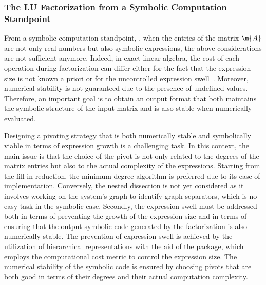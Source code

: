 \subsubsection{The LU Factorization from a Symbolic Computation Standpoint}

From a symbolic computation standpoint, \ie{}, when the entries of the matrix $\m{A}$ are not only real numbers but also symbolic expressions, the above considerations are not sufficient anymore. Indeed, in exact linear algebra, the cost of each operation during factorization can differ either for the fact that the expression size is not known a priori or for the uncontrolled expression swell~\cite{zhou2006hierarchical}. Moreover, numerical stability is not guaranteed due to the presence of undefined values. Therefore, an important goal is to obtain an output format that both maintains the symbolic structure of the input matrix and is also stable when numerically evaluated.

Designing a pivoting strategy that is both numerically stable and symbolically viable in terms of expression growth is a challenging task. In this context, the main issue is that the choice of the pivot is not only related to the degrees of the matrix entries but also to the actual complexity of the expressions. Starting from the fill-in reduction, the minimum degree algorithm is preferred due to its ease of implementation. Conversely, the nested dissection is not yet considered as it involves working on the system's graph to identify graph separators, which is no easy task in the symbolic case. Secondly, the expression swell must be addressed both in terms of preventing the growth of the expression size and in terms of ensuring that the output symbolic code generated by the factorization is also numerically stable. The prevention of expression swell is achieved by the utilization of hierarchical representations with the aid of the \LEM{} package, which employs the computational cost metric to control the expression size. The numerical stability of the symbolic code is ensured by choosing pivots that are both good in terms of their degrees and their actual computation complexity.

